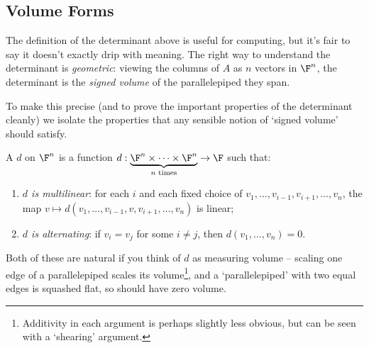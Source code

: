 \subsection{Volume Forms}

The definition of the determinant above is useful for computing, but it's fair to say it doesn't exactly drip with meaning. The right way to understand the determinant is \emph{geometric}: viewing the columns of $A$ as $n$ vectors in $\F^n$, the determinant is the \emph{signed volume} of the parallelepiped they span.

\begin{center}
\end{center}

To make this precise (and to prove the important properties of the determinant cleanly) we isolate the properties that any sensible notion of `signed volume' should satisfy.

\begin{definition}
    A  $d$ on $\F^n$ is a function $d: \underbrace{\F^n \times \cdots \times \F^n}_{n \text{ times}} \rightarrow \F$ such that:
    \begin{enumerate}[label=(\roman*)]
        \item \emph{$d$ is multilinear}: for each $i$ and each fixed choice of $v_1, \dots, v_{i - 1}, v_{i + 1}, \dots, v_n$, the map $v \mapsto d(v_1, \dots, v_{i-1}, v, v_{i + 1}, \dots, v_n)$ is linear;
        \item \emph{$d$ is alternating}: if $v_i = v_j$ for some $i \neq j$, then $d(v_1, \dots, v_n) = 0$.
    \end{enumerate}
\end{definition}

Both of these are natural if you think of $d$ as measuring volume -- scaling one edge of a parallelepiped scales its volume\footnote{Additivity in each argument is perhaps slightly less obvious, but can be seen with a `shearing' argument.}, and a `parallelepiped' with two equal edges is squashed flat, so should have zero volume.

